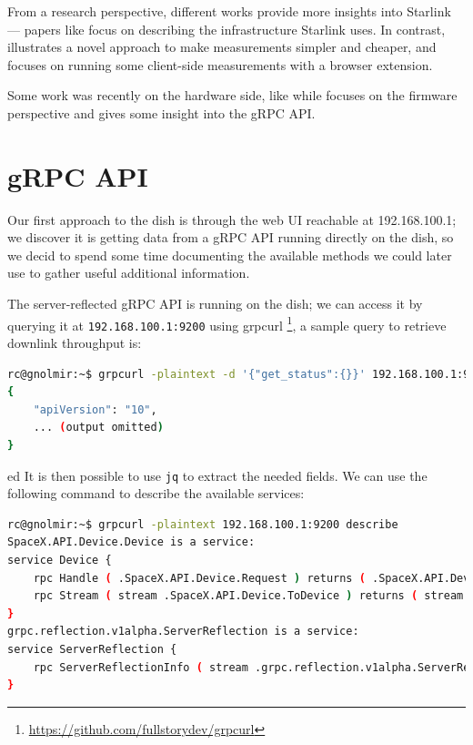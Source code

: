 \documentclass[IN,11pt,twoside,openright,idp,english]{tumthesis}
\begin{document}
From a research perspective, different works provide more insights into Starlink — papers like \cite{pan2023measuring} focus on describing the infrastructure Starlink uses. In contrast, \cite{izhikevich2023democratizing} illustrates a novel approach to make measurements simpler and cheaper, and \cite{browser-side} focuses on running some client-side measurements with a browser extension.
    
Some work was recently on the hardware side, like \cite{glitching} while \cite{quarkslab} focuses on the firmware perspective and gives some insight into the gRPC API.
    
\section{gRPC API}
    
Our first approach to the dish is through the web UI reachable at 192.168.100.1; we discover it is getting data from a gRPC API running directly on the dish, so we decid to spend some time documenting the available methods we could later use to gather useful additional information.
    
The server-reflected gRPC API is running on the dish; we can access it by querying it at \texttt{192.168.100.1:9200} using grpcurl \footnote{\url{https://github.com/fullstorydev/grpcurl}}, a sample query to retrieve downlink throughput is:
    
\begin{lstlisting}[language=bash]
rc@gnolmir:~$ grpcurl -plaintext -d '{"get_status":{}}' 192.168.100.1:9200 SpaceX.API.Device.Device/Handle
{
    "apiVersion": "10",
    ... (output omitted)
}
\end{lstlisting}
ed
It is then possible to use \texttt{jq} to extract the needed fields. We can use the following command to describe the available services:
    
\begin{lstlisting}[language=bash]
rc@gnolmir:~$ grpcurl -plaintext 192.168.100.1:9200 describe
SpaceX.API.Device.Device is a service:
service Device {
    rpc Handle ( .SpaceX.API.Device.Request ) returns ( .SpaceX.API.Device.Response );
    rpc Stream ( stream .SpaceX.API.Device.ToDevice ) returns ( stream .SpaceX.API.Device.FromDevice );
}
grpc.reflection.v1alpha.ServerReflection is a service:
service ServerReflection {
    rpc ServerReflectionInfo ( stream .grpc.reflection.v1alpha.ServerReflectionRequest ) returns ( stream .grpc.reflection.v1alpha.ServerReflectionResponse );
}
\end{lstlisting}
    
\end{document}

